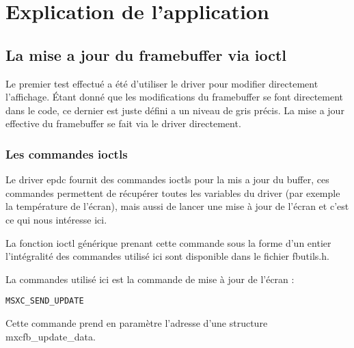 \chapter{Explication de l'application} %


\section{La mise a jour du framebuffer via ioctl}

Le premier test effectué a été d'utiliser le driver pour modifier directement l'affichage.
Étant donné que les modifications du framebuffer se font directement dans le code, ce dernier est juste défini a un niveau de gris précis. La mise a jour effective du framebuffer se fait via le driver directement.

\subsection{Les commandes ioctls}

Le driver epdc fournit des commandes ioctls pour la mis a jour du buffer, ces commandes 
permettent de récupérer toutes les variables du driver (par exemple la température de l'écran), mais aussi de lancer une mise à jour de l'écran et c'est ce qui nous intéresse ici.

La fonction ioctl générique prenant cette commande sous la forme d'un entier l'intégralité des commandes utilisé ici sont disponible dans le fichier fbutils.h. %


La commandes utilisé ici est la commande de mise à jour de l'écran : 
\begin{lstlisting}
MSXC_SEND_UPDATE
\end{lstlisting}
Cette commande prend en paramètre l'adresse d'une structure mxcfb_update_data.

